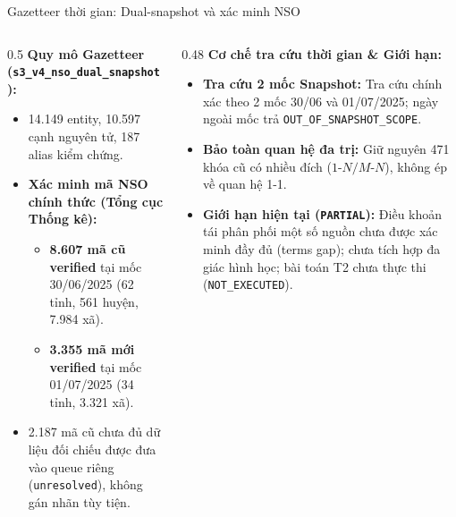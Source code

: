\documentclass[aspectratio=169, 9pt]{beamer}
\begin{document}
\begin{frame}{Gazetteer thời gian: Dual-snapshot và xác minh NSO}
  \vspace{-0.15cm}
  {\fontsize{8.2pt}{10.5pt}\selectfont
  \begin{columns}[T]
    \begin{column}{0.5\textwidth}
      \textbf{Quy mô Gazetteer (\texttt{s3\_v4\_nso\_dual\_snapshot}):}
      \begin{itemize}
        \setlength{\itemsep}{2.5pt}
        \item 14.149 entity, 10.597 cạnh nguyên tử, 187 alias kiểm chứng.
        \item \textbf{Xác minh mã NSO chính thức (Tổng cục Thống kê):}
        \begin{itemize}
          \setlength{\itemsep}{1.5pt}
          \item \textbf{8.607 mã cũ verified} tại mốc 30/06/2025 (62 tỉnh, 561 huyện, 7.984 xã).
          \item \textbf{3.355 mã mới verified} tại mốc 01/07/2025 (34 tỉnh, 3.321 xã).
        \end{itemize}
        \item 2.187 mã cũ chưa đủ dữ liệu đối chiếu được đưa vào queue riêng (\texttt{unresolved}), không gán nhãn tùy tiện.
      \end{itemize}
    \end{column}
    \begin{column}{0.48\textwidth}
      \textbf{Cơ chế tra cứu thời gian \& Giới hạn:}
      \begin{itemize}
        \setlength{\itemsep}{2.5pt}
        \item \textbf{Tra cứu 2 mốc Snapshot:} Tra cứu chính xác theo 2 mốc 30/06 và 01/07/2025; ngày ngoài mốc trả \texttt{OUT\_OF\_SNAPSHOT\_SCOPE}.
        \item \textbf{Bảo toàn quan hệ đa trị:} Giữ nguyên 471 khóa cũ có nhiều đích ($1\text{-}N / M\text{-}N$), không ép về quan hệ 1-1.
        \item \textbf{Giới hạn hiện tại (\color{alertred}\texttt{PARTIAL}\color{black}):} Điều khoản tái phân phối một số nguồn chưa được xác minh đầy đủ (terms gap); chưa tích hợp đa giác hình học; bài toán T2 chưa thực thi (\texttt{NOT\_EXECUTED}).
      \end{itemize}
    \end{column}
  \end{columns}
  }
\end{frame}
\end{document}

